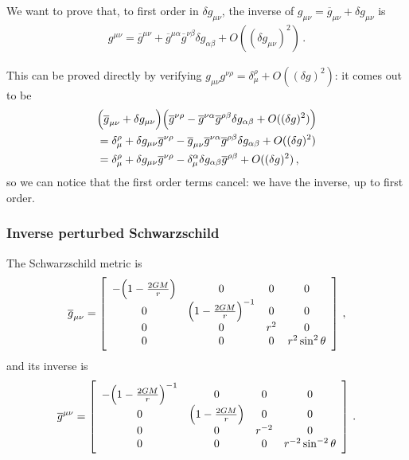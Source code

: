 \documentclass[main.tex]{subfiles}
\begin{document}
We want to prove that, to first order in \(\delta g_{\mu \nu }\), the inverse of \(g_{\mu \nu } = \overline{g}_{\mu \nu } + \delta g_{\mu \nu }\) is 
%
\begin{align}
  g^{\mu \nu } = 
  \overline{g}^{\mu \nu } + \overline{g}^{\mu \alpha } \overline{g}^{\nu \beta } \delta g_{\alpha \beta } + O((\delta g_{\mu \nu })^2)
\,.
\end{align}

This can be proved directly by verifying \(g_{ \mu \nu } g^{\nu \rho } = \delta_{\mu }^{\rho } + O((\delta g)^2)\): it comes out to be 
%
\begin{align}
  &\qty(\overline{g}_{\mu \nu } + \delta g_{\mu \nu })
  \qty(\overline{g}^{\nu \rho } - \overline{g}^{\nu  \alpha } \overline{g}^{\rho  \beta } \delta g_{\alpha \beta } + O((\delta g)^2)) \\
  &= \delta_{\mu }^{\rho } + \delta g_{\mu \nu } \overline{g}^{\nu \rho } - \overline{g}_{\mu \nu }\overline{g}^{\nu \alpha } \overline{g}^{\rho \beta } \delta g_{\alpha \beta } + O((\delta g)^2)  \\
  &=  \delta_{\mu }^{\rho } + \delta g_{\mu \nu } \overline{g}^{\nu \rho } - \delta_{\mu}^{\alpha } \delta g_{\alpha \beta } \overline{g}^{\rho \beta }  + O((\delta g)^2)
\,,
\end{align}
%
so we can notice that the first order terms cancel: we have the inverse, up to first order. 

\subsubsection{Inverse perturbed Schwarzschild}

The Schwarzschild metric is 
%
\begin{align}
  \overline{g}_{\mu \nu } = \left[\begin{array}{cccc}
  -\qty(1 - \frac{2GM}{r}) & 0 & 0 & 0 \\ 
  0 & \qty(1 - \frac{2GM}{r})^{-1} & 0 & 0 \\ 
  0 & 0 & r^2 & 0 \\ 
  0 & 0 & 0 & r^2 \sin^2 \theta 
  \end{array}\right]
\,,
\end{align}
%
and its inverse is 
%
\begin{align}
  \overline{g}^{\mu \nu } = \left[\begin{array}{cccc}
  -\qty(1 -\frac{2GM}{r})^{-1}  & 0 & 0 & 0 \\ 
  0 & \qty(1- \frac{2GM}{r}) & 0 & 0 \\ 
  0 & 0 & r^{-2} & 0 \\ 
  0 & 0 & 0 & r^{-2} \sin^{-2} \theta 
  \end{array}\right]
\,.
\end{align}
\end{document}
